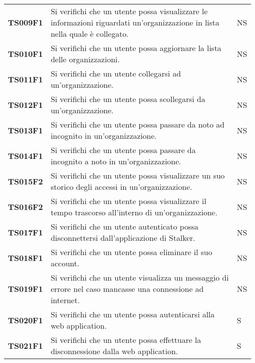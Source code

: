 \documentclass[../piano-di-qualifica.tex]{subfiles}
\begin{document}
\begin{longtable}[H]{>{\centering\bfseries}m{3cm} >{}m{10cm} >{\centering\arraybackslash}m{3cm}}
  TS009F1            & Si verifichi che un utente possa visualizzare le informazioni riguardati un'organizzazione in lista nella quale è collegato. 
  & NS               \\


  TS010F1            & Si verifichi che un utente possa aggiornare la lista delle organizzazioni. 
  & NS               \\

  TS011F1            & Si verifichi che un utente collegarsi ad un'organizzazione. 
  & NS               \\

  TS012F1            & Si verifichi che un utente possa scollegarsi da un'organizzazione. 
  & NS               \\

  TS013F1            & Si verifichi che un utente possa passare da noto ad incognito in un'organizzazione. 
  & NS               \\

  TS014F1            & Si verifichi che un utente possa passare da incognito a noto in un'organizzazione. 
  & NS               \\

  TS015F2            & Si verifichi che un utente possa visualizzare un suo storico degli accessi in un'organizzazione. 
  & NS               \\

  TS016F2            & Si verifichi che un utente possa visualizzare il tempo trascorso all'interno di un'organizzazione. 
  & NS               \\

  TS017F1            & Si verifichi che un utente autenticato possa disconnettersi dall'applicazione di Stalker. 
  & NS               \\

  TS018F1            & Si verifichi che un utente possa eliminare il suo account. 
  & NS               \\

  TS019F1            & Si verifichi che un utente visualizza un messaggio di errore nel caso mancasse una connessione ad internet. 
  & NS               \\

  TS020F1            & Si verifichi che un utente possa autenticarsi alla web application. 
  & S               \\

  TS021F1            & Si verifichi che un utente possa effettuare la disconnessione dalla web application. 
  & S               \\
  

\end{longtable}
\end{document}
